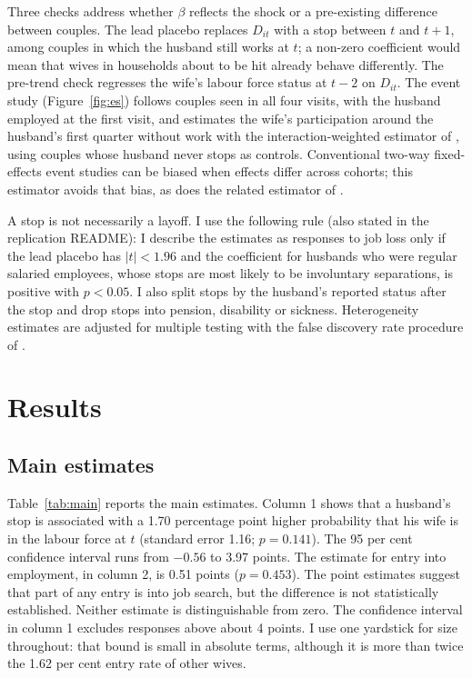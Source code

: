 Three checks address whether $\beta$ reflects the shock or a pre-existing difference between couples. The lead placebo replaces $D_{it}$ with a stop between $t$ and $t+1$, among couples in which the husband still works at $t$; a non-zero coefficient would mean that wives in households about to be hit already behave differently. The pre-trend check regresses the wife's labour force status at $t-2$ on $D_{it}$. The event study (Figure~\ref{fig:es}) follows couples seen in all four visits, with the husband employed at the first visit, and estimates the wife's participation around the husband's first quarter without work with the interaction-weighted estimator of \citet{sun2021}, using couples whose husband never stops as controls. Conventional two-way fixed-effects event studies can be biased when effects differ across cohorts; this estimator avoids that bias, as does the related estimator of \citet{callaway2021}.

A stop is not necessarily a layoff. I use the following rule (also stated in the replication README): I describe the estimates as responses to job loss only if the lead placebo has $|t|<1.96$ and the coefficient for husbands who were regular salaried employees, whose stops are most likely to be involuntary separations, is positive with $p<0.05$. I also split stops by the husband's reported status after the stop and drop stops into pension, disability or sickness. Heterogeneity estimates are adjusted for multiple testing with the false discovery rate procedure of \citet{benjamini1995}.

\section{Results}

\subsection{Main estimates}

Table~\ref{tab:main} reports the main estimates. Column 1 shows that a husband's stop is associated with a 1.70 percentage point higher probability that his wife is in the labour force at $t$ (standard error 1.16; $p=0.141$). The 95 per cent confidence interval runs from $-0.56$ to 3.97 points. The estimate for entry into employment, in column 2, is 0.51 points ($p=0.453$). The point estimates suggest that part of any entry is into job search, but the difference is not statistically established. Neither estimate is distinguishable from zero. The confidence interval in column 1 excludes responses above about 4 points. I use one yardstick for size throughout: that bound is small in absolute terms, although it is more than twice the 1.62 per cent entry rate of other wives.

